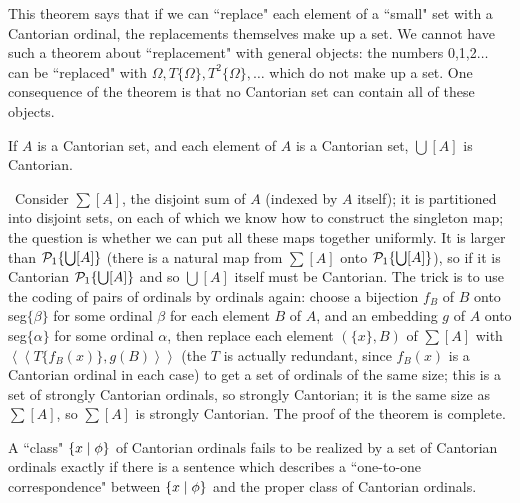 This theorem says that if we can ``replace" each element of a
``small" set with a Cantorian ordinal, the replacements themselves make
up a set.  We cannot have such a theorem about ``replacement" with
general objects: the numbers 0,1,2$\ldots$ can be ``replaced" with $\Omega,
T\{\Omega\}, T^2\{\Omega\},\ldots$ which do
not make up a set.  One consequence of the theorem is that no Cantorian
set can contain all of these objects.

\begin{thm}
 If $A$ is a Cantorian set, and each element of $A$ is
 a Cantorian set, $\bigcup[A]$ is Cantorian.
\end{thm}

\preuve\ Consider $\sum[ A]$, the disjoint sum of $A$ (indexed by $A$ itself); it is partitioned into
disjoint sets, on each of which we know how to construct the
singleton map; the question is whether we 
can put all these maps together uniformly.  It is larger than ${\cal
P}_1\{\bigcup[A]\}$ (there is a natural map from $\sum[ A]$ onto ${\cal P}_1\{\bigcup[A]\}$), so if it is Cantorian
${\cal P}_1\{\bigcup[A]\}$ and so $\bigcup[A]$ itself must be Cantorian.  The
trick is to use the coding of pairs of ordinals by
ordinals again:
choose a bijection $f_B$ of $B$ onto seg$\{\beta\}$ for some
ordinal $\beta$ for each element $B$ of $A$, and an embedding $g$ of $A$ onto
seg$\{\alpha\}$ for some ordinal $\alpha$, then replace each element
$(\{x\},B)$ of $\sum[ A]$ with
$\left<\left<T\{f_B(x)\},g(B)\right>\right>$ (the $T$ is actually
redundant, since $f_B(x)$ is a Cantorian ordinal in
each case) to get a set of ordinals of the same size; this is a set of strongly
Cantorian ordinals, so strongly Cantorian; it is the
same size as $\sum[ A]$, so $\sum[ A]$ is strongly Cantorian.  The proof of the
theorem is complete.
\finpreuve

\begin{thm}
 A ``class" $\{x \mid \phi\}$ of Cantorian ordinals
 fails to be realized by a set of Cantorian ordinals
 exactly if there is a sentence which describes a ``one-to-one correspondence"
 between $\{x \mid \phi\}$ and the proper class of Cantorian ordinals.
\end{thm}

